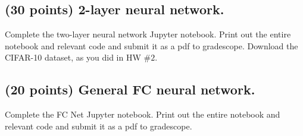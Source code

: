 \documentclass{article}
\begin{document}
\pagebreak 


\subsection*{(30 points) 2-layer neural network. \newline}

Complete the two-layer neural network Jupyter notebook. Print out the entire notebook and
relevant code and submit it as a pdf to gradescope. Download the CIFAR-10 dataset, as you
did in HW $\#2$. \newline 




\subsection*{(20 points) General FC neural network. \newline}

Complete the FC Net Jupyter notebook. Print out the entire notebook and relevant code
and submit it as a pdf to gradescope.
\end{document}
